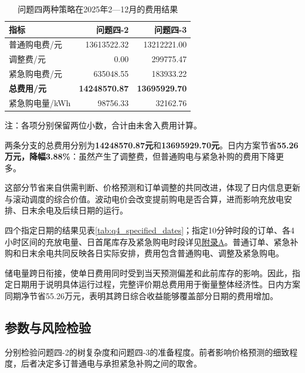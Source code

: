 \begin{table}[!htbp]
    \centering
    \caption{问题四两种策略在2025年2—12月的费用结果}
    \label{tab:q4_final_results}
    \begin{tabular}{lrr}
        \hline
        指标 & 问题四-2 & 问题四-3 \\
        \hline
        普通购电费/元 & 13613522.32 & 13212221.00 \\
        调整费/元 & 0.00 & 299775.47 \\
        紧急购电费/元 & 635048.55 & 183933.22 \\
        \textbf{总费用/元} & \textbf{14248570.87} & \textbf{13695929.70} \\
        紧急购电量/kWh & 98756.33 & 32162.76 \\
        \hline
    \end{tabular}
\par\smallskip
{\small 注：各项分别保留两位小数，合计由未舍入费用计算。}
\end{table}

两条分支的总费用分别为\textbf{14248570.87元}和\textbf{13695929.70元}。日内方案节省\textbf{55.26万元，降幅3.88\%}：虽然产生了调整费，但普通购电与紧急补购的费用下降更多。

\begin{samepage}
这部分节省来自供需判断、价格预测和订单调整的共同改进，体现了日内信息更新与滚动调度的综合价值。波动电价会改变提前购电是否合算，进而影响充放电安排、日末余电及后续日期的运行。
\par\end{samepage}

四个指定日期的结果见表\ref{tab:q4_specified_dates}；指定10分钟时段的订单、各4小时区间的充放电量、日首尾库存及紧急购电时段详见\hyperref[app:q4_details]{附录A}。普通订单、紧急补购和日末余电共同反映各日实际安排，费用包含普通购电、调整及紧急购电。



储电量跨日衔接，使单日费用同时受到当天预测偏差和此前库存的影响。因此，指定日期用于说明具体运行过程，完整评价期总费用用于衡量整体经济性。日内方案同期净节省55.26万元，表明其跨日综合收益能够覆盖部分日期的费用增加。

\subsection{参数与风险检验}

分别检验问题四-2的树复杂度和问题四-3的准备程度。前者影响价格预测的细致程度，后者决定多订普通电与承担紧急补购之间的取舍。



